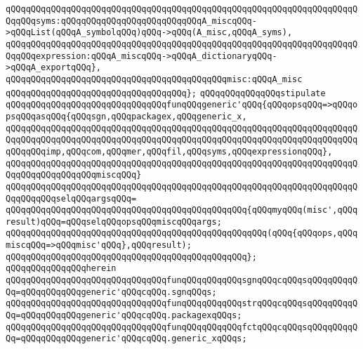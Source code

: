 \verb|qQQqqQQqqQQqqQQqqQQqqQQqqQQqqQQqqQQqqQQqqQQqqQQqqQQqqQQqqQQqqQQqqQQqqQQqqQQqsyms:qQQqqQQqqQQqqQQqqQQqqQQqqQQqA_miscqQQq->qQQqList(qQQqA_symbolqQQq)qQQq->qQQq(A_misc,qQQqA_syms),|\newline
\newline
\verb|qQQqqQQqqQQqqQQqqQQqqQQqqQQqqQQqqQQqqQQqqQQqqQQqqQQqqQQqqQQqqQQqqQQqqQQqqQQqexpression:qQQqA_miscqQQq->qQQqA_dictionaryqQQq->qQQqA_exportqQQq},|\newline
\verb|qQQqqQQqqQQqqQQqqQQqqQQqqQQqqQQqqQQqqQQqqQQqmisc:qQQqA_misc|\newline
\verb|qQQqqQQqqQQqqQQqqQQqqQQqqQQqqQQqqQQq};|\newline
\newline
\verb|qQQqqQQqqQQqqQQqstipulate|\newline
\newline
\verb|qQQqqQQqqQQqqQQqqQQqqQQqqQQqqQQqfunqQQqgeneric'qQQq{qQQqopsqQQq=>qQQqopsqQQqasqQQq{qQQqsgn,qQQqpackagex,qQQqgeneric_x,|\newline
\verb|qQQqqQQqqQQqqQQqqQQqqQQqqQQqqQQqqQQqqQQqqQQqqQQqqQQqqQQqqQQqqQQqqQQqqQQqqQQqqQQqqQQqqQQqqQQqqQQqqQQqqQQqqQQqqQQqqQQqqQQqqQQqqQQqqQQqqQQqqQQqqQQqqQQqimp,qQQqcom,qQQqmer,qQQqfil,qQQqsyms,qQQqexpressionqQQq},|\newline
\verb|qQQqqQQqqQQqqQQqqQQqqQQqqQQqqQQqqQQqqQQqqQQqqQQqqQQqqQQqqQQqqQQqqQQqqQQqqQQqqQQqqQQqqQQqmiscqQQq}|\newline
\verb|qQQqqQQqqQQqqQQqqQQqqQQqqQQqqQQqqQQqqQQqqQQqqQQqqQQqqQQqqQQqqQQqqQQqqQQqqQQqqQQqselqQQqargsqQQq=|\newline
\verb|qQQqqQQqqQQqqQQqqQQqqQQqqQQqqQQqqQQqqQQqqQQqqQQq{qQQqmyqQQq(misc',qQQqresult)qQQq=qQQqselqQQqopsqQQqmiscqQQqargs;|\newline
\verb|qQQqqQQqqQQqqQQqqQQqqQQqqQQqqQQqqQQqqQQqqQQqqQQqqQQq(qQQq{qQQqops,qQQqmiscqQQq=>qQQqmisc'qQQq},qQQqresult);|\newline
\verb|qQQqqQQqqQQqqQQqqQQqqQQqqQQqqQQqqQQqqQQqqQQqqQQq};|\newline
\verb|qQQqqQQqqQQqqQQqherein|\newline
\verb|qQQqqQQqqQQqqQQqqQQqqQQqqQQqqQQqfunqQQqqQQqqQQqsgnqQQqcqQQqsqQQqqQQqqQQq=qQQqqQQqqQQqgeneric'qQQqcqQQq.sgnqQQqs;|\newline
\verb|qQQqqQQqqQQqqQQqqQQqqQQqqQQqqQQqfunqQQqqQQqqQQqstrqQQqcqQQqsqQQqqQQqqQQq=qQQqqQQqqQQqgeneric'qQQqcqQQq.packagexqQQqs;|\newline
\verb|qQQqqQQqqQQqqQQqqQQqqQQqqQQqqQQqfunqQQqqQQqqQQqfctqQQqcqQQqsqQQqqQQqqQQq=qQQqqQQqqQQqgeneric'qQQqcqQQq.generic_xqQQqs;|\newline
